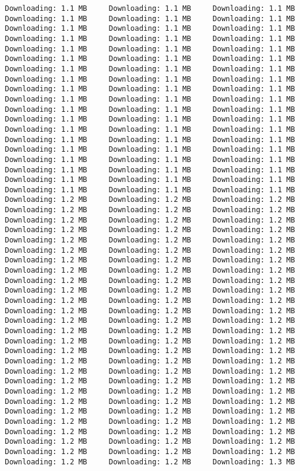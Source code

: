 \documentclass[
  12pt,
  portuguese,
]{report}
\begin{document}
\begin{verbatim}
Downloading: 1.1 MB     Downloading: 1.1 MB     Downloading: 1.1 MB     Downloading: 1.1 MB     Downloading: 1.1 MB     Downloading: 1.1 MB     Downloading: 1.1 MB     Downloading: 1.1 MB     Downloading: 1.1 MB     Downloading: 1.1 MB     Downloading: 1.1 MB     Downloading: 1.1 MB     Downloading: 1.1 MB     Downloading: 1.1 MB     Downloading: 1.1 MB     Downloading: 1.1 MB     Downloading: 1.1 MB     Downloading: 1.1 MB     Downloading: 1.1 MB     Downloading: 1.1 MB     Downloading: 1.1 MB     Downloading: 1.1 MB     Downloading: 1.1 MB     Downloading: 1.1 MB     Downloading: 1.1 MB     Downloading: 1.1 MB     Downloading: 1.1 MB     Downloading: 1.1 MB     Downloading: 1.1 MB     Downloading: 1.1 MB     Downloading: 1.1 MB     Downloading: 1.1 MB     Downloading: 1.1 MB     Downloading: 1.1 MB     Downloading: 1.1 MB     Downloading: 1.1 MB     Downloading: 1.1 MB     Downloading: 1.1 MB     Downloading: 1.1 MB     Downloading: 1.1 MB     Downloading: 1.1 MB     Downloading: 1.1 MB     Downloading: 1.1 MB     Downloading: 1.1 MB     Downloading: 1.1 MB     Downloading: 1.1 MB     Downloading: 1.1 MB     Downloading: 1.1 MB     Downloading: 1.1 MB     Downloading: 1.1 MB     Downloading: 1.1 MB     Downloading: 1.1 MB     Downloading: 1.1 MB     Downloading: 1.1 MB     Downloading: 1.1 MB     Downloading: 1.1 MB     Downloading: 1.1 MB     Downloading: 1.2 MB     Downloading: 1.2 MB     Downloading: 1.2 MB     Downloading: 1.2 MB     Downloading: 1.2 MB     Downloading: 1.2 MB     Downloading: 1.2 MB     Downloading: 1.2 MB     Downloading: 1.2 MB     Downloading: 1.2 MB     Downloading: 1.2 MB     Downloading: 1.2 MB     Downloading: 1.2 MB     Downloading: 1.2 MB     Downloading: 1.2 MB     Downloading: 1.2 MB     Downloading: 1.2 MB     Downloading: 1.2 MB     Downloading: 1.2 MB     Downloading: 1.2 MB     Downloading: 1.2 MB     Downloading: 1.2 MB     Downloading: 1.2 MB     Downloading: 1.2 MB     Downloading: 1.2 MB     Downloading: 1.2 MB     Downloading: 1.2 MB     Downloading: 1.2 MB     Downloading: 1.2 MB     Downloading: 1.2 MB     Downloading: 1.2 MB     Downloading: 1.2 MB     Downloading: 1.2 MB     Downloading: 1.2 MB     Downloading: 1.2 MB     Downloading: 1.2 MB     Downloading: 1.2 MB     Downloading: 1.2 MB     Downloading: 1.2 MB     Downloading: 1.2 MB     Downloading: 1.2 MB     Downloading: 1.2 MB     Downloading: 1.2 MB     Downloading: 1.2 MB     Downloading: 1.2 MB     Downloading: 1.2 MB     Downloading: 1.2 MB     Downloading: 1.2 MB     Downloading: 1.2 MB     Downloading: 1.2 MB     Downloading: 1.2 MB     Downloading: 1.2 MB     Downloading: 1.2 MB     Downloading: 1.2 MB     Downloading: 1.2 MB     Downloading: 1.2 MB     Downloading: 1.2 MB     Downloading: 1.2 MB     Downloading: 1.2 MB     Downloading: 1.2 MB     Downloading: 1.2 MB     Downloading: 1.2 MB     Downloading: 1.2 MB     Downloading: 1.2 MB     Downloading: 1.2 MB     Downloading: 1.2 MB     Downloading: 1.2 MB     Downloading: 1.2 MB     Downloading: 1.2 MB     Downloading: 1.2 MB     Downloading: 1.2 MB     Downloading: 1.2 MB     Downloading: 1.2 MB     Downloading: 1.2 MB     Downloading: 1.2 MB     Downloading: 1.2 MB     Downloading: 1.2 MB     Downloading: 1.2 MB     Downloading: 1.2 MB     Downloading: 1.2 MB     Downloading: 1.3 MB     
\end{verbatim}
\end{document}
